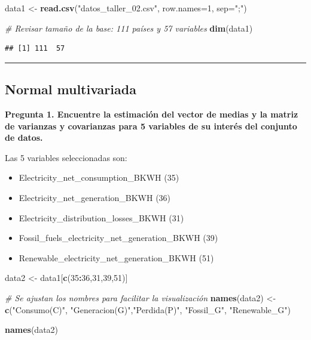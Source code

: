 \documentclass[
]{article}
\newenvironment{Shaded}{\begin{snugshade}}{\end{snugshade}}
\newcommand{\AttributeTok}[1]{\textcolor[rgb]{0.13,0.29,0.53}{#1}}
\newcommand{\CommentTok}[1]{\textcolor[rgb]{0.56,0.35,0.01}{\textit{#1}}}
\newcommand{\DecValTok}[1]{\textcolor[rgb]{0.00,0.00,0.81}{#1}}
\newcommand{\FunctionTok}[1]{\textcolor[rgb]{0.13,0.29,0.53}{\textbf{#1}}}
\newcommand{\NormalTok}[1]{#1}
\newcommand{\OtherTok}[1]{\textcolor[rgb]{0.56,0.35,0.01}{#1}}
\newcommand{\SpecialCharTok}[1]{\textcolor[rgb]{0.81,0.36,0.00}{\textbf{#1}}}
\newcommand{\StringTok}[1]{\textcolor[rgb]{0.31,0.60,0.02}{#1}}
\begin{document}
\begin{Shaded}
\begin{Highlighting}[]
\NormalTok{data1 }\OtherTok{\textless{}{-}} \FunctionTok{read.csv}\NormalTok{(}\StringTok{"datos\_taller\_02.csv"}\NormalTok{, }\AttributeTok{row.names=}\DecValTok{1}\NormalTok{, }\AttributeTok{sep=}\StringTok{";"}\NormalTok{)}

\CommentTok{\# Revisar tamaño de la base: 111 países y 57 variables}
\FunctionTok{dim}\NormalTok{(data1)}
\end{Highlighting}
\end{Shaded}

\begin{verbatim}
## [1] 111  57
\end{verbatim}

\begin{center}\rule{0.5\linewidth}{0.5pt}\end{center}

\subsection{Normal multivariada}\label{normal-multivariada}

\noindent\textbf{Pregunta 1. Encuentre la estimación del vector de medias y la matriz de varianzas y covarianzas para 5 variables de su interés del conjunto de datos.}

Las 5 variables seleccionadas son:

\begin{itemize}
\item
  Electricity\_net\_consumption\_BKWH (35)
\item
  Electricity\_net\_generation\_BKWH (36)
\item
  Electricity\_distribution\_losses\_BKWH (31)
\item
  Fossil\_fuels\_electricity\_net\_generation\_BKWH (39)
\item
  Renewable\_electricity\_net\_generation\_BKWH (51)
\end{itemize}

\begin{Shaded}
\begin{Highlighting}[]
\NormalTok{data2 }\OtherTok{\textless{}{-}}\NormalTok{ data1[}\FunctionTok{c}\NormalTok{(}\DecValTok{35}\SpecialCharTok{:}\DecValTok{36}\NormalTok{,}\DecValTok{31}\NormalTok{,}\DecValTok{39}\NormalTok{,}\DecValTok{51}\NormalTok{)]}

\CommentTok{\# Se ajustan los nombres para facilitar la visualización}
\FunctionTok{names}\NormalTok{(data2) }\OtherTok{\textless{}{-}} \FunctionTok{c}\NormalTok{(}\StringTok{"Consumo(C)"}\NormalTok{, }\StringTok{"Generacion(G)"}\NormalTok{,}\StringTok{"Perdida(P)"}\NormalTok{,}
                  \StringTok{"Fossil\_G"}\NormalTok{, }\StringTok{"Renewable\_G"}\NormalTok{)}

\FunctionTok{names}\NormalTok{(data2)}
\end{Highlighting}
\end{Shaded}
\end{document}
